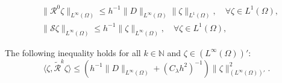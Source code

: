 \documentclass[10pt,a4paper]{amsart}
\begin{document}
\begin{equation}\label{eqn20}
\begin{aligned}
{}&\|\mathcal{R}^{0}\zeta\|_{L^{\infty}(\Omega)} \leq h^{-1}\|D\|_{L^{\infty}(\Omega)} \|\zeta\|_{L^{1}(\Omega)}, \quad \forall \zeta \in L^{1}(\Omega),\\
{}&\|\mathcal{S} \zeta\|_{L^\infty(\Omega)} \leq h^{-1} \|\zeta\|_{L^\infty(\Omega)}, \quad \forall \zeta \in L^{1}(\Omega),
\end{aligned}
\end{equation}

\begin{theorem}\label{thm1}
The following inequality holds for all $k \in \mathbb{N}$ and $\zeta \in (L^{\infty}(\Omega))'$:
\begin{equation}\label{eqn19}
\langle \zeta, \widetilde{\mathcal{R}}^{k}\zeta\rangle \leq (h^{-1}\|D\|_{L^\infty(\Omega)}+(C_{\lambda}h^{2})^{-1} )\|\zeta\|_{(L^\infty(\Omega))'}^2.
\end{equation}
\end{theorem}
\end{document}
